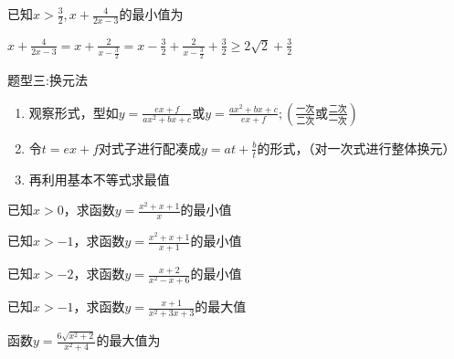 \par
\begin{problem}
    已知$\displaystyle x>\frac{3}{2},x+\frac{4}{2x-3}$的最小值为
    \begin{jiexi}
        $\displaystyle x+\frac{4}{2x-3}=x+\frac{2}{x-\frac{3}{2}}=x-\frac{3}{2}+\frac{2}{x-\frac{3}{2}}+\frac{3}{2}\ge2\sqrt{2}+\frac{3}{2}$
    \end{jiexi}
\end{problem}

\begin{tcolorbox} 
    \centering
    题型三:换元法
    \tcblower %
    \begin{enumerate}
        \item 观察形式，型如$\displaystyle y=\frac{ex+f}{ax^2+bx+c}$或$\displaystyle y=\frac{ax^2+bx+c}{ex+f};(\frac{\text{一次}}{\text{二次}}\text{或}\frac{\text{二次}}{\text{一次}})$
        \item 令$t=ex+f$对式子进行配凑成$\displaystyle y=at+\frac{b}{t}$的形式，（对一次式进行整体换元）
        \item 再利用基本不等式求最值
    \end{enumerate}
\end{tcolorbox}


\par
\begin{problem}
    已知$x>0$，求函数$\displaystyle y=\frac{x^2+x+1}{x}$的最小值
\end{problem}

\par
\begin{problem}
    已知$x>-1$，求函数$\displaystyle y=\frac{x^2+x+1}{x+1}$的最小值
\end{problem}

\par
\begin{problem}
    已知$x>-2$，求函数$\displaystyle y=\frac{x+2}{x^2-x+6}$的最小值
\end{problem}

\par
\begin{problem}
    已知$x>-1$，求函数$\displaystyle y=\frac{x+1}{x^2+3x+3}$的最大值
\end{problem}

\par
\begin{problem}
    函数$\displaystyle y=\frac{6\sqrt{x^2+2}}{x^2+4}$的最大值为
\end{problem}


